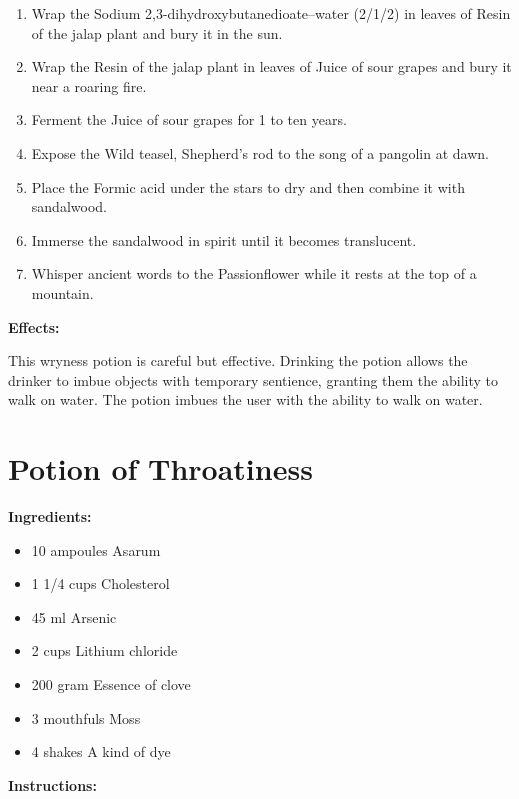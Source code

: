 \documentclass{article}
\begin{document}
\begin{enumerate}
  \item Wrap the Sodium 2,3-dihydroxybutanedioate--water (2/1/2) in leaves of Resin of the jalap plant and bury it in the sun.
  \item Wrap the Resin of the jalap plant in leaves of Juice of sour grapes and bury it near a roaring fire.
  \item Ferment the Juice of sour grapes for 1 to ten years.
  \item Expose the Wild teasel, Shepherd's rod to the song of a pangolin at dawn.
  \item Place the Formic acid under the stars to dry and then combine it with sandalwood.
  \item Immerse the sandalwood in spirit until it becomes translucent.
  \item Whisper ancient words to the Passionflower while it rests at the top of a mountain.
\end{enumerate}

\textbf{Effects:}

This wryness potion is careful but effective. Drinking the potion allows the drinker to imbue objects with temporary sentience, granting them the ability to walk on water. The potion imbues the user with the ability to walk on water.

\newpage
\section*{Potion of Throatiness}

\textbf{Ingredients:}

\begin{itemize}
  \item 10 ampoules Asarum
  \item 1 1/4 cups Cholesterol
  \item 45 ml Arsenic
  \item 2 cups Lithium chloride
  \item 200 gram Essence of clove
  \item 3 mouthfuls Moss
  \item 4 shakes A kind of dye
\end{itemize}

\textbf{Instructions:}
\end{document}
